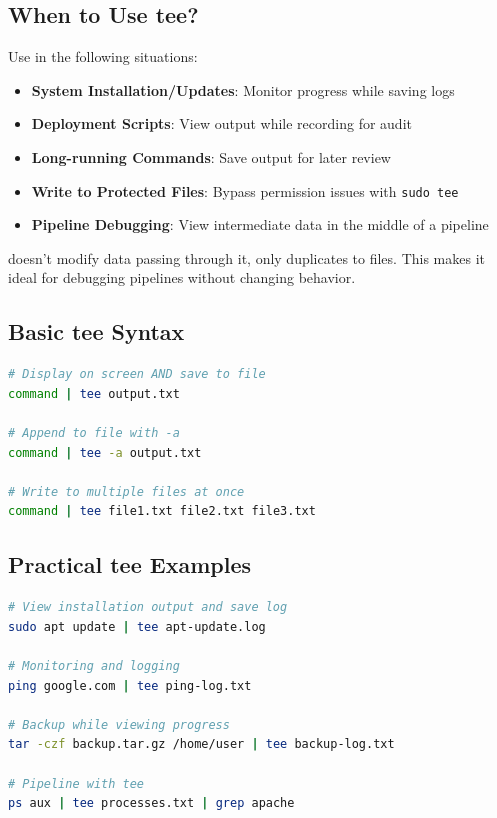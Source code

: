 \subsection{When to Use tee?}

Use  in the following situations:

\begin{itemize}
	\item \textbf{System Installation/Updates}: Monitor progress while saving logs
	\item \textbf{Deployment Scripts}: View output while recording for audit
	\item \textbf{Long-running Commands}: Save output for later review
	\item \textbf{Write to Protected Files}: Bypass permission issues with \texttt{sudo tee}
	\item \textbf{Pipeline Debugging}: View intermediate data in the middle of a pipeline
\end{itemize}

\begin{notebox}
	 doesn't modify data passing through it, only duplicates to files. This makes it ideal for debugging pipelines without changing behavior.
\end{notebox}

\subsection{Basic tee Syntax}

\begin{lstlisting}[language=bash, caption={Basic tee syntax}]
# Display on screen AND save to file
command | tee output.txt

# Append to file with -a
command | tee -a output.txt

# Write to multiple files at once
command | tee file1.txt file2.txt file3.txt
\end{lstlisting}

\subsection{Practical tee Examples}

\begin{lstlisting}[language=bash, caption={Practical tee examples}]
# View installation output and save log
sudo apt update | tee apt-update.log

# Monitoring and logging
ping google.com | tee ping-log.txt

# Backup while viewing progress
tar -czf backup.tar.gz /home/user | tee backup-log.txt

# Pipeline with tee
ps aux | tee processes.txt | grep apache
\end{lstlisting}

